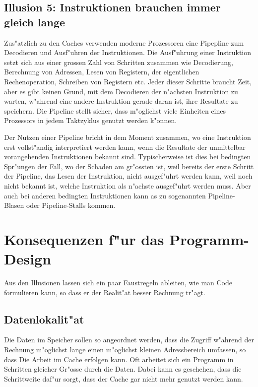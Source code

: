 \subsection{Illusion 5: Instruktionen brauchen immer gleich lange}
Zus"atzlich zu den Caches verwenden moderne Prozessoren eine Pipepline
zum Decodieren und Ausf"uhren der Instruktionen.
Die Ausf"uhrung einer Instruktion setzt sich aus einer grossen Zahl
von Schritten zusammen wie Decodierung, Berechnung von Adressen,
Lesen von Registern, der eigentlichen Rechenoperation, Schreiben
von Registern etc.
Jeder dieser Schritte braucht Zeit, aber es gibt keinen Grund, mit
dem Decodieren der n"achsten Instruktion zu warten, w"ahrend eine
andere Instruktion gerade daran ist, ihre Resultate zu speichern.
Die Pipeline stellt sicher, dass m"oglichst viele Einheiten eines
Prozessors in jedem Taktzyklus genutzt werden k"onnen.

Der Nutzen einer Pipeline bricht in dem Moment zusammen, wo eine Instruktion
erst vollst"andig interpretiert werden kann, wenn die Resultate
der unmittelbar vorangehenden Instruktionen bekannt sind.
Typischerweise ist dies bei bedingten Spr"ungen der Fall, wo der
Schaden am gr"ossten ist, weil bereits der erste Schritt der Pipeline,
das Lesen der Instruktion, nicht ausgef"uhrt werden kann, weil noch nicht
bekannt ist, welche Instruktion als n"achste ausgef"uhrt werden muss.
Aber auch bei anderen bedingten Instruktionen kann as zu sogenannten
Pipeline-Blasen oder Pipeline-Stalls kommen.

\section{Konsequenzen f"ur das Programm-Design}
Aus den Illusionen lassen sich ein paar Faustregeln ableiten, wie man
Code formulieren kann, so dass er der Realit"at besser Rechnung tr"agt.

\subsection{Datenlokalit"at}
Die Daten im Speicher sollen so angeordnet werden, dass die Zugriff w"ahrend
der Rechnung m"oglichst lange einen m"oglichst kleinen Adressbereich umfassen,
so dass Die Arbeit im Cache erfolgen kann.
Oft arbeitet sich ein Programm in Schritten gleicher Gr"osse durch die
Daten.
Dabei kann es geschehen, dass die Schrittweite daf"ur sorgt, dass der
Cache gar nicht mehr genutzt werden kann.

